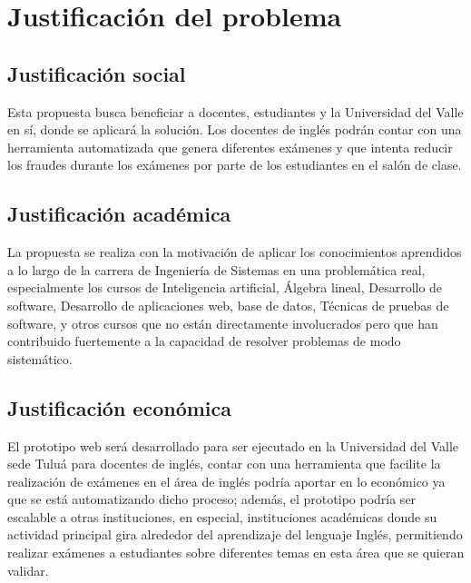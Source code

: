 \documentclass[../Main.tex]{subfiles}
\begin{document}
\section{Justificación del problema}


\subsection{Justificación social}
\begin{justify}
Esta propuesta busca beneficiar a docentes, estudiantes y la Universidad del Valle en sí, donde se aplicará la solución. Los docentes de inglés podrán contar con una herramienta automatizada que genera diferentes exámenes y que intenta reducir los fraudes durante los exámenes por parte de los estudiantes en el salón de clase.
\end{justify}\par


\subsection{Justificación académica}
\begin{justify}
La propuesta se realiza con la motivación de aplicar los conocimientos aprendidos a lo largo de la carrera de Ingeniería de Sistemas en una problemática real, especialmente los cursos de Inteligencia artificial, Álgebra lineal, Desarrollo de software, Desarrollo de aplicaciones web, base de datos, Técnicas de pruebas de software, y otros cursos que no están directamente involucrados pero que han contribuido fuertemente a la capacidad de resolver problemas de modo sistemático.
\end{justify}\par

\subsection{Justificación económica}
\begin{justify}
El prototipo web será desarrollado para ser ejecutado en la Universidad del Valle sede Tuluá para docentes de inglés, contar con una herramienta que facilite la realización de exámenes  en el área de inglés podría aportar en lo económico ya que se está automatizando dicho proceso; además, el prototipo podría ser escalable a otras instituciones, en especial, instituciones académicas donde su actividad principal gira alrededor del aprendizaje del lenguaje Inglés, permitiendo realizar exámenes a estudiantes sobre diferentes temas en esta área que se quieran validar.
\end{justify}\par
\end{document}
